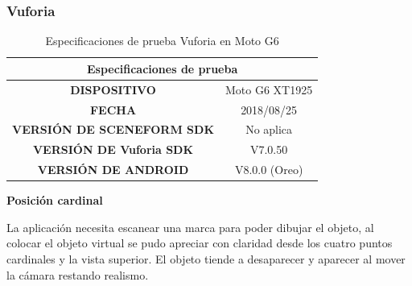 \subsubsection{Vuforia}
\begin{table}[H]
	\centering
	\begin{tabular}{|c|c|}
		\hline
		\multicolumn{2}{|c|}{Especificaciones de prueba}   \\ \hline
		\textbf{DISPOSITIVO}              & Moto G6 XT1925 \\ \hline
		\textbf{FECHA}                    & 2018/08/25     \\ \hline
		\textbf{VERSIÓN DE SCENEFORM SDK} & No aplica         \\ \hline
		\textbf{VERSIÓN DE Vuforia SDK}    & V7.0.50        \\ \hline
		\textbf{VERSIÓN DE ANDROID}       & V8.0.0 (Oreo)  \\ \hline
	\end{tabular}
	\captionsetup{justification=centering}
	\caption{Especificaciones de prueba Vuforia en Moto G6}
\end{table}

\textbf{Posición cardinal} \par
La aplicación necesita escanear una marca para poder dibujar el objeto, al colocar el objeto virtual se pudo apreciar con claridad desde los cuatro puntos cardinales y la vista superior. El objeto tiende a desaparecer y aparecer al mover la cámara restando realismo.

